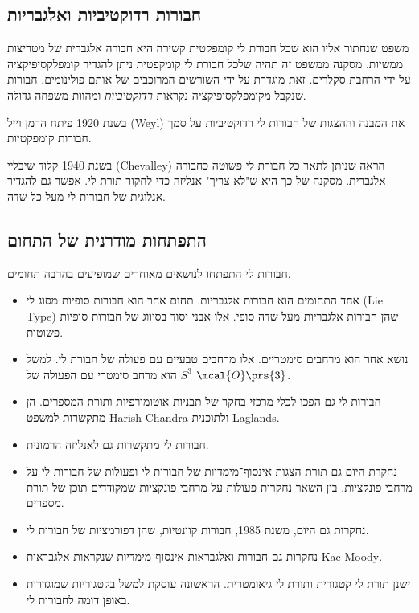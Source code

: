 \documentclass[10pt, twoside]{book}
\newcommand{\textenglish}[1]{\foreignlanguage{english}{#1}}
\begin{document}
\subsection{חבורות רדוקטיביות ואלגבריות}

משפט שנחתור אליו הוא שכל חבורת לי קומפקטית קשירה היא חבורה אלגברית של מטריצות ממשיות.
מסקנה ממשפט זה תהיה שלכל חבורת לי קומקפטית ניתן להגדיר קומפלקסיפיקציה על ידי הרחבת סקלרים. זאת מוגדרת על ידי השורשים המרוכבים של אותם פולינומים.
חבורות שנקבל מקומפלקסיפיקציה נקראות
\emph{רדוקטיביות}
ומהוות משפחה גדולה.

בשנת 1920 פיתח הרמן וייל
\textenglish{(Weyl)}
את המבנה וההצגות של חבורות לי רדוקטיביות על סמך חבורות קומפקטיות.

בשנת 1940 קלוד שיבליי
\textenglish{(Chevalley)}
הראה שניתן לתאר כל חבורת לי פשוטה כחבורה אלגברית.
מסקנה של כך היא ש"לא צריך" אנליזה כדי לחקור תורת לי.
אפשר גם להגדיר אנלוגית של חבורות לי מעל כל שדה.

\subsection{התפתחות מודרנית של התחום}

חבורות לי התפתחו לנושאים מאוחרים שמופיעים בהרבה תחומים.

\begin{itemize}
\item
אחד התחומים הוא חבורות אלגבריות. תחום אחר הוא חבורות סופיות מסוג לי
\textenglish{(Lie Type)}
שהן חבורות אלגבריות מעל שדה סופי. אלו אבני יסוד בסיווג של חבורות סופיות פשוטות.

\item
נושא אחר הוא מרחבים סימטריים. אלו מרחבים טבעיים עם פעולה של חבורת לי. למשל
$S^3$
הוא מרחב סימטרי עם הפעולה של
$\mcal{O}\prs{3}$.

\item
חבורות לי גם הפכו לכלי מרכזי בחקר של תבניות אוטומורפיות ותורת המספרים. הן מתקשרות למשפט
\textenglish{Harish-Chandra}%
ולתוכנית
\textenglish{Laglands}.

\item
חבורות לי מתקשרות גם לאנליזה הרמונית.

\item נחקרת היום גם תורת הצגות אינסוף־מימדיות של חבורות לי ופעולות של חבורות לי על מרחבי פונקציות.
בין השאר נחקרות פעולות על מרחבי פונקציות שמקודדים תוכן של תורת מספרים.

\item
נחקרות גם היום, משנת 1985, חבורות קוונטיות, שהן דפורמציות של חבורות לי.

\item נחקרות גם חבורות ואלגבראות אינסוף־מימדיות שנקראות
אלגבראות
\textenglish{Kac-Moody}.

\item ישנן תורת לי קטגורית ותורת לי גיאומטרית. הראשונה עוסקת למשל בקטגוריות שמוגדרות באופן דומה לחבורות לי.

\end{itemize}
\end{document}
